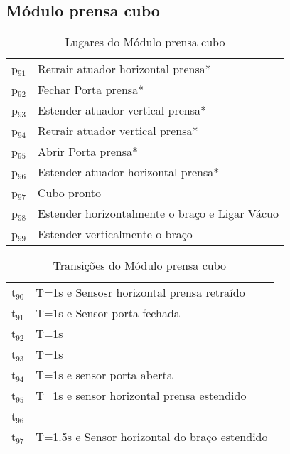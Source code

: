 \documentclass[11pt]{article}
\begin{document}
\subsection{Módulo prensa cubo}
\label{sec-1-5}
\begin{table}[htb]
\caption{Lugares do Módulo prensa cubo}
\centering
\begin{tabular}{ll}
p$_{\text{91}}$ & Retrair atuador horizontal prensa*\\
p$_{\text{92}}$ & Fechar Porta prensa*\\
p$_{\text{93}}$ & Estender atuador vertical prensa*\\
p$_{\text{94}}$ & Retrair atuador vertical prensa*\\
p$_{\text{95}}$ & Abrir Porta prensa*\\
p$_{\text{96}}$ & Estender atuador horizontal prensa*\\
p$_{\text{97}}$ & Cubo pronto\\
p$_{\text{98}}$ & Estender horizontalmente o braço e Ligar Vácuo\\
p$_{\text{99}}$ & Estender verticalmente o braço\\
\end{tabular}
\end{table}

\begin{table}[htb]
\caption{Transições do Módulo prensa cubo}
\centering
\begin{tabular}{ll}
t$_{\text{90}}$ & T=1s e Sensosr horizontal prensa retraído\\
t$_{\text{91}}$ & T=1s e Sensor porta fechada\\
t$_{\text{92}}$ & T=1s\\
t$_{\text{93}}$ & T=1s\\
t$_{\text{94}}$ & T=1s e sensor porta aberta\\
t$_{\text{95}}$ & T=1s e sensor horizontal prensa estendido\\
t$_{\text{96}}$ & \\
t$_{\text{97}}$ & T=1.5s e Sensor horizontal do braço estendido\\
\end{tabular}
\end{table}
\end{document}
